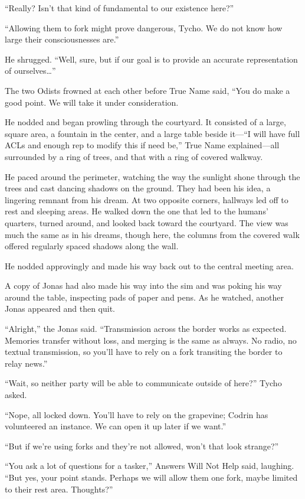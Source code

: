 ``Really? Isn't that kind of fundamental to our existence here?''

``Allowing them to fork might prove dangerous, Tycho. We do not know how large their consciousnesses are.''

He shrugged. ``Well, sure, but if our goal is to provide an accurate representation of ourselves\ldots{}''

The two Odists frowned at each other before True Name said, ``You do make a good point. We will take it under consideration.

He nodded and began prowling through the courtyard. It consisted of a large, square area, a fountain in the center, and a large table beside it—``I will have full ACLs and enough rep to modify this if need be,'' True Name explained—all surrounded by a ring of trees, and that with a ring of covered walkway.

He paced around the perimeter, watching the way the sunlight shone through the trees and cast dancing shadows on the ground. They had been his idea, a lingering remnant from his dream. At two opposite corners, hallways led off to rest and sleeping areas. He walked down the one that led to the humans' quarters, turned around, and looked back toward the courtyard. The view was much the same as in his dreams, though here, the columns from the covered walk offered regularly spaced shadows along the wall.

He nodded approvingly and made his way back out to the central meeting area.

A copy of Jonas had also made his way into the sim and was poking his way around the table, inspecting pads of paper and pens. As he watched, another Jonas appeared and then quit.

``Alright,'' the Jonas said. ``Transmission across the border works as expected. Memories transfer without loss, and merging is the same as always. No radio, no textual transmission, so you'll have to rely on a fork transiting the border to relay news.''

``Wait, so neither party will be able to communicate outside of here?'' Tycho asked.

``Nope, all locked down. You'll have to rely on the grapevine; Codrin has volunteered an instance. We can open it up later if we want.''

``But if we're using forks and they're not allowed, won't that look strange?''

``You ask a lot of questions for a tasker,'' Answers Will Not Help said, laughing. ``But yes, your point stands. Perhaps we will allow them one fork, maybe limited to their rest area. Thoughts?''

